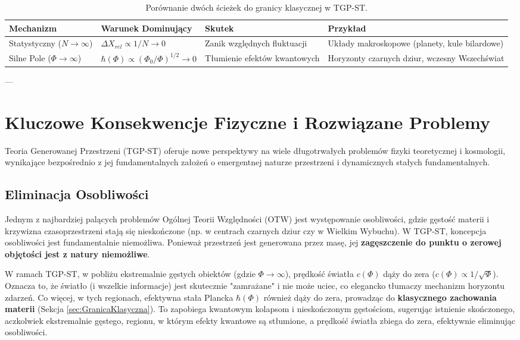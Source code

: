 \documentclass[11pt,a4paper]{article}
\begin{document}
\begin{table}[h!]
    \centering
    \small 
    \setlength{\tabcolsep}{3.5pt}

    \begin{tabular}{|>{\centering\arraybackslash}p{2.5cm}|p{4.2cm}|p{4.2cm}|p{3.8cm}|}
        \hline
        \textbf{Mechanizm} & \textbf{Warunek Dominujący} & \textbf{Skutek} & \textbf{Przykład} \\
        \hline
        Statystyczny ($N \rightarrow \infty$) & $\Delta X_{rel} \propto 1/N \rightarrow 0$ & Zanik względnych fluktuacji & Układy makroskopowe (planety, kule bilardowe) \\
        \hline
        Silne Pole ($\Phi \rightarrow \infty$) & $\hbar(\Phi) \propto (\Phi_0/\Phi)^{1/2} \rightarrow 0$ & Tłumienie efektów kwantowych & Horyzonty czarnych dziur, wczesny Wszechświat \\
        \hline
    \end{tabular}
    \caption{Porównanie dwóch ścieżek do granicy klasycznej w TGP-ST.}
    \label{tab:ClassicalLimits}
\end{table}

---

\section{Kluczowe Konsekwencje Fizyczne i Rozwiązane Problemy}
\label{sec:Konsekwencje}

Teoria Generowanej Przestrzeni (TGP-ST) oferuje nowe perspektywy na wiele długotrwałych problemów fizyki teoretycznej i kosmologii, wynikające bezpośrednio z jej fundamentalnych założeń o emergentnej naturze przestrzeni i dynamicznych stałych fundamentalnych.

\subsection{Eliminacja Osobliwości}
Jednym z najbardziej palących problemów Ogólnej Teorii Względności (OTW) jest występowanie osobliwości, gdzie gęstość materii i krzywizna czasoprzestrzeni stają się nieskończone (np. w centrach czarnych dziur czy w Wielkim Wybuchu). W TGP-ST, koncepcja osobliwości jest fundamentalnie niemożliwa. Ponieważ przestrzeń jest generowana przez masę, jej \textbf{zagęszczenie do punktu o zerowej objętości jest z natury niemożliwe}.

W ramach TGP-ST, w pobliżu ekstremalnie gęstych obiektów (gdzie $\Phi \rightarrow \infty$), prędkość światła $c(\Phi)$ dąży do zera ($c(\Phi) \propto 1/\sqrt{\Phi}$). Oznacza to, że światło (i wszelkie informacje) jest skutecznie "zamrażane" i nie może uciec, co elegancko tłumaczy mechanizm horyzontu zdarzeń. Co więcej, w tych regionach, efektywna stała Plancka $\hbar(\Phi)$ również dąży do zera, prowadząc do \textbf{klasycznego zachowania materii} (Sekcja \ref{sec:GranicaKlasyczna}). To zapobiega kwantowym kolapsom i nieskończonym gęstościom, sugerując istnienie skończonego, aczkolwiek ekstremalnie gęstego, regionu, w którym efekty kwantowe są stłumione, a prędkość światła zbiega do zera, efektywnie eliminując osobliwości.
\end{document}

